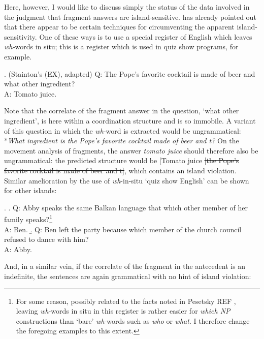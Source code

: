 \documentclass[11pt,letterpaper]{article}
\newcommand{\el}[1]{\sout{#1}}
\begin{document}
Here, however, I would like to discuss simply the status of the data involved in the judgment that fragment answers are island-sensitive. \cite{St06} has already pointed out that there appear to be certain techniques for circumventing the apparent island-sensitivity. One of these ways is to use a special register of English which leaves {\it wh-}words in situ; this is a register which is used in quiz show programs, for example.

\ex. 	(Stainton's (EX), adapted) %
	Q: The Pope's favorite cocktail is made of beer and what other ingredient?\\
	A: Tomato juice.
	
Note that the correlate of the fragment answer in the question, `what other ingredient', is here within a coordination structure and is so immobile. A variant of this question in which the {\it wh}-word is extracted would be ungrammatical: *{\it What ingredient is the Pope's favorite cocktail made of beer and t?} On the movement analysis of fragments, the answer {\it tomato juice} should therefore also be ungrammatical: the predicted structure would be [Tomato juice \el{[the Pope's favorite cocktail is made of beer and t]}, which contains an island violation. Similar amelioration by the use of {\it wh}-in-situ `quiz show English' can be shown for other islands:

\ex. 	\a. Q: Abby speaks the same Balkan language that which other member of her family speaks?\footnote{For some reason, possibly related to the facts noted in Pesetsky REF %
, leaving {\it wh}-words in situ in this register is rather easier for {\it which NP} constructions than `bare' {\it wh}-words such as {\it who} or {\it what}. I therefore change the foregoing examples to this extent.}\\
	    A: Ben.
	 \b. Q: Ben left the party because which member of the church council refused to dance with him?\\
	 	A: Abby.
	 

And, in a similar vein, if the correlate of the fragment in the antecedent is an indefinite, the sentences are again grammatical with no hint of island violation:
\end{document}

